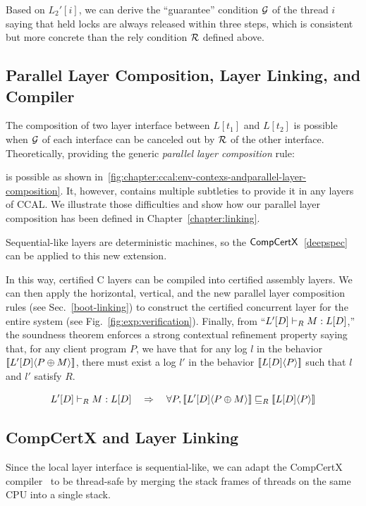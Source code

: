 Based on $L_2'[i]$, we can  derive the ``guarantee'' condition $\mathcal{G}$ of the thread $i$ saying that held locks are always released within three steps, which is consistent but more concrete than the rely condition $\mathcal{R}$ defined above.

\subsection{Parallel Layer Composition, Layer Linking, and Compiler}

The composition of two layer interface between $L[t_1]$ and $L[t_2]$ is possible 
when $\mathcal{G}$ of each interface can be canceled out by $\mathcal{R}$ of the other interface. 
Theoretically, providing the generic \textit{parallel layer composition} rule:
{}

is possible as shown in~\ref{fig:chapter:ccal:env-contexs-andparallel-layer-composition}.
It, however, contains multiple subtleties to provide it in any layers of CCAL. 
We illustrate those difficulties and show how our parallel layer composition has been defined in Chapter~\ref{chapter:linking}.


Sequential-like layers are deterministic machines, so the $\mathsf{CompCertX}$~\ref{deepspec} can be applied to this new extension. 

In this way, 
certified C layers can be compiled into certified assembly layers. We can then apply the horizontal, 
vertical, and the new parallel layer
composition rules (see Sec.~\ref{boot-linking}) to construct the certified concurrent layer for the entire system (see Fig.~\ref{fig:exp:verification}). Finally, from ``$L'[D] \vdash_{R} M : L[D]$,'' the soundness theorem enforces a strong contextual refinement property saying that, for any client program $P$, we have that for any log $l$ in the behavior $[\![{L'[D]} \langle {P \oplus M} \rangle]\!]$, there must exist a log $l'$ in the behavior $[\![{L[D]} \langle {P} \rangle]\!]$
such that $l$ and $l'$ satisfy $R$.

\begin{theorem}[Soundness]
$$L'[D] \vdash_{R} M : L[D] \quad\Rightarrow\quad \forall P, [\![{L'[D]} \langle {P\oplus{}M} \rangle]\!] \sqsubseteq_R [\![{L[D]} \langle {P} \rangle]\!]$$
\end{theorem}



\subsection{CompCertX and Layer Linking}


Since the local layer interface is sequential-like, we can adapt the CompCertX compiler~\cite{deepspec} to be thread-safe by merging the stack frames of threads on the same CPU into a single stack. 

